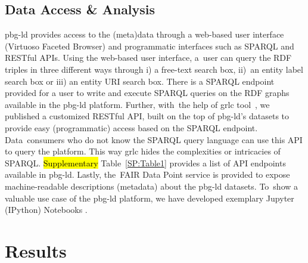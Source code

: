 \documentclass[applsci,article,accept,moreauthors,pdftex]{Definitions/mdpi}
\begin{document}
{%
\subsection{Data Access \& Analysis}
pbg-ld %
provides access to the (meta)data through a web-based user interface (Virtuoso Faceted Browser) and programmatic interfaces such as SPARQL and RESTful APIs.
Using the web-based user interface, a~user can query the RDF triples in three different ways through i) a free-text search box, ii)~an entity label search box or iii) an entity URI search box. %
There is a SPARQL endpoint provided for a user to write and execute SPARQL queries on the RDF graphs available in the pbg-ld platform. Further, with~the help of grlc tool~\cite{Merono-Penuela2016},
we published a customized RESTful API, %
built on the top of pbg-ld’s datasets to provide easy (programmatic) access based on the SPARQL endpoint.
Data~consumers who do not know the SPARQL query language can use this API %
to query the platform. This way grlc hides the complexities or intricacies of SPARQL. \hl{Supplementary} Table~\ref{SP:Table1}  %
provides a list of API endpoints %
available in pbg-ld. Lastly, the~FAIR Data Point service is provided to expose machine-readable descriptions (metadata) about the pbg-ld datasets.
To~show a valuable use case of the pbg-ld platform, %
we have developed exemplary Jupyter (IPython) Notebooks \cite{Notebooks,kluyver2016jupyter}. %

\section{Results}
\unskip
}
\end{document}
